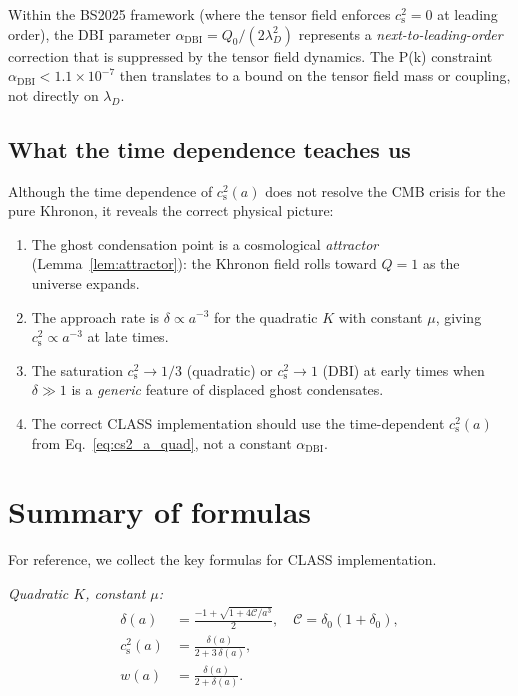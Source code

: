 \documentclass[prd,twocolumn,superscriptaddress,longbibliography,floatfix]{revtex4-2}
\newcommand{\cs}{c_{\mathrm{s}}}
\begin{document}
Within the BS2025 framework (where the tensor field
enforces $\cs^2 = 0$ at leading order), the DBI
parameter $\alpha_{\mathrm{DBI}} = Q_0/(2\lambda_D^2)$
represents a \emph{next-to-leading-order} correction
that is suppressed by the tensor field dynamics.  The
P(k) constraint $\alpha_{\mathrm{DBI}} < 1.1 \times 10^{-7}$
then translates to a bound on the tensor field mass
or coupling, not directly on $\lambda_D$.

\subsection{What the time dependence teaches us}

Although the time dependence of $\cs^2(a)$ does not
resolve the CMB crisis for the pure Khronon, it
reveals the correct physical picture:

\begin{enumerate}
\item The ghost condensation point is a cosmological
  \emph{attractor} (Lemma~\ref{lem:attractor}): the
  Khronon field rolls toward $Q = 1$ as the universe
  expands.

\item The approach rate is $\delta \propto a^{-3}$ for
  the quadratic $K$ with constant $\mu$, giving
  $\cs^2 \propto a^{-3}$ at late times.

\item The saturation $\cs^2 \to 1/3$ (quadratic) or
  $\cs^2 \to 1$ (DBI) at early times when
  $\delta \gg 1$ is a \emph{generic} feature of
  displaced ghost condensates.

\item The correct CLASS implementation should use
  the time-dependent $\cs^2(a)$ from
  Eq.~\eqref{eq:cs2_a_quad}, not a constant
  $\alpha_{\mathrm{DBI}}$.
\end{enumerate}


\section{Summary of formulas}
\label{sec:formulas}

For reference, we collect the key formulas for
CLASS implementation.

\emph{Quadratic $K$, constant $\mu$:}
\begin{align}
\delta(a) &= \frac{-1 + \sqrt{1 + 4\mathcal{C}/a^3}}{2},
\quad \mathcal{C} = \delta_0(1{+}\delta_0),
\label{eq:summary_delta}\\[4pt]
\cs^2(a) &= \frac{\delta(a)}{2 + 3\,\delta(a)},
\label{eq:summary_cs2}\\[4pt]
w(a) &= \frac{\delta(a)}{2 + \delta(a)}.
\label{eq:summary_w}
\end{align}
\end{document}
